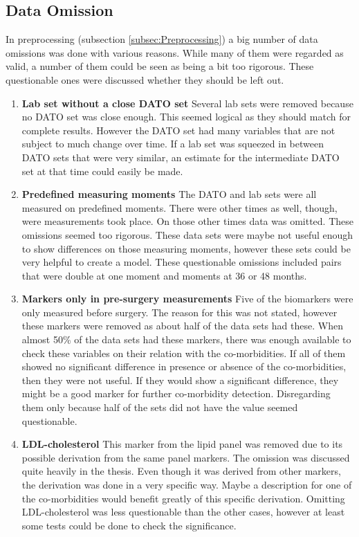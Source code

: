 \documentclass[10pt,a4paper]{article}
\begin{document}
	\subsection{Data Omission}
	
	In preprocessing (subsection \ref{subsec:Preprocessing}) a big number of data omissions was done with various reasons. While many of them were regarded as valid, a number of them could be seen as being a bit too rigorous. These questionable ones were discussed whether they should be left out.
	
	\begin{enumerate}
		\item \textbf{Lab set without a close DATO set} Several lab sets were removed because no DATO set was close enough. This seemed logical as they should match for complete results. However the DATO set had many variables that are not subject to much change over time. If a lab set was squeezed in between DATO sets that were very similar, an estimate for the intermediate DATO set at that time could easily be made.
		
		\item \textbf{Predefined measuring moments} The DATO and lab sets were all measured on predefined moments. There were other times as well, though, were measurements took place. On those other times data was omitted. These omissions seemed too rigorous. These data sets were maybe not useful enough to show differences on those measuring moments, however these sets could be very helpful to create a model. These questionable omissions included pairs that were double at one moment and moments at 36 or 48 months. 
		
		\item \textbf{Markers only in pre-surgery measurements} Five of the biomarkers were only measured before surgery. The reason for this was not stated, however these markers were removed as about half of the data sets had these. When almost 50\% of the data sets had these markers, there was enough available to check these variables on their relation with the co-morbidities. If all of them showed no significant difference in presence or absence of the co-morbidities, then they were not useful. If they would show a significant difference, they might be a good marker for further co-morbidity detection. Disregarding them only because half of the sets did not have the value seemed questionable.
		
		\item \textbf{LDL-cholesterol} This marker from the lipid panel was removed due to its possible derivation from the same panel markers. The omission was discussed quite heavily in the thesis. Even though it was derived from other markers, the derivation was done in a very specific way. Maybe a description for one of the co-morbidities would benefit greatly of this specific derivation. Omitting LDL-cholesterol was less questionable than the other cases, however at least some tests could be done to check the significance.
		
	\end{enumerate}
	
\end{document}
